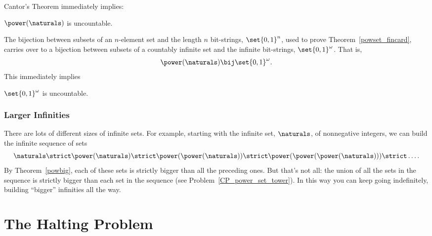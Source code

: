 Cantor's Theorem immediately implies:

\begin{corollary}
$\power(\naturals)$ is uncountable.
\end{corollary}

The bijection between subsets of an $n$-element set and the length $n$
bit-strings, $\set{0,1}^n$, used to prove
Theorem~\ref{powset_fincard}, carries over to a bijection between
subsets of a countably infinite set and the infinite bit-strings,
$\set{0,1}^{\omega}$.  That is,
\[
\power(\naturals) \bij \set{0,1}^{\omega}.
\]
This immediately implies
\begin{corollary}
$\set{0,1}^{\omega}$ is uncountable.
\end{corollary}

\subsubsection{Larger Infinities}

There are lots of different sizes of infinite sets.  For example,
starting with the infinite set, $\naturals$, of nonnegative integers,
we can build the infinite sequence of sets
\[
\naturals \strict \power(\naturals) \strict \power(\power(\naturals))
\strict \power(\power(\power(\naturals))) \strict \dots.
\]
By Theorem~\ref{powbig}, each of these sets is strictly bigger than
all the preceding ones.  But that's not all: the union of all the sets
in the sequence is strictly bigger than each set in the sequence (see
Problem~\ref{CP_power_set_tower}).  In this way you can keep going
indefinitely, building ``bigger'' infinities all the way.


\begin{problems}
\practiceproblems
{}

\classproblems
{}

\homeworkproblems
{}

\examproblems
{}

\end{problems}

\section{The Halting Problem}\label{halting_sec}

